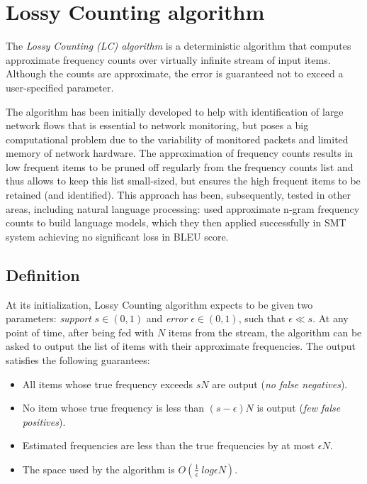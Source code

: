 \chapter{Lossy Counting algorithm}
\label{chap:lossy-counting}

The \emph{Lossy Counting (LC) algorithm} \citep{manku:lossycounting} is
a deterministic algorithm that computes approximate frequency counts
over virtually infinite stream of input items.
Although the counts are approximate, the error is guaranteed not to exceed
a user-specified parameter.

The algorithm has been initially developed to help with identification of
large network flows that is essential to network monitoring, but poses a big
computational problem due to the variability of monitored packets and limited
memory of network hardware.
The approximation of frequency counts results in low frequent items to be pruned
off regularly from the frequency counts list and thus allows to keep this list
small-sized, but ensures the high frequent items to be retained (and identified).
This approach has been, subsequently, tested in other areas, including natural
language processing: \citet{goyal:streaminglm} used approximate n-gram frequency
counts to build language models, which they then applied successfully in SMT
system achieving no significant loss in BLEU score.

\section{Definition}

At its initialization, Lossy Counting algorithm expects to be given two parameters:
\emph{support} $s \in (0,1)$ and \emph{error} $\epsilon \in (0,1)$, such
that $\epsilon \ll s$.
At any point of time, after being fed with $N$ items from the stream,
the algorithm can be asked to output the list of items with their approximate
frequencies.
The output satisfies the following guarantees:
\begin{itemize}
 \item All items whose true frequency exceeds $sN$ are output
  (\emph{no false negatives}).
 \item No item whose true frequency is less than $(s - \epsilon)N$ is output
  (\emph{few false positives}).
 \item Estimated frequencies are less than the true frequencies by at most
  $\epsilon N$.
 \item The space used by the algorithm is $O(\frac{1}{\epsilon}~log \epsilon N)$.
\end{itemize}


